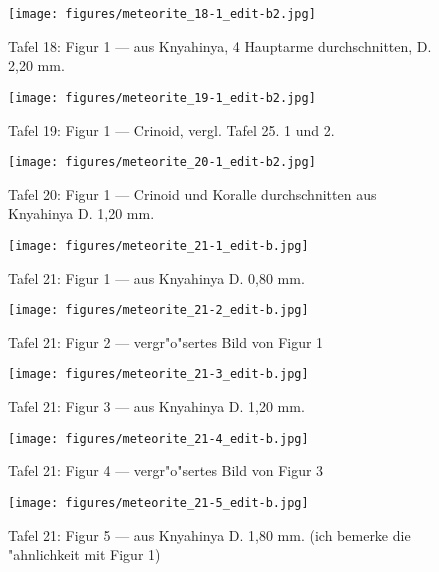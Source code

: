 \documentclass[a4paper, 11pt, oneside]{article}
\begin{document}
\begin{figure}[t]
\texttt{[image: figures/meteorite\_18-1\_edit-b2.jpg]}
\caption{Tafel 18: Figur 1 --- aus Knyahinya, 4 Hauptarme durchschnitten, D. 2,20 mm.}
\centering
\end{figure}
\clearpage
{}
\begin{figure}[t]
\texttt{[image: figures/meteorite\_19-1\_edit-b2.jpg]}
\caption{Tafel 19: Figur 1 --- Crinoid, vergl. Tafel 25. 1 und 2.}
\centering
\end{figure}
\clearpage
{}
\begin{figure}[t]
\texttt{[image: figures/meteorite\_20-1\_edit-b2.jpg]}
\caption{Tafel 20: Figur 1 --- Crinoid und Koralle durchschnitten aus Knyahinya D. 1,20 mm.}
\centering
\end{figure}
\clearpage
{}
\begin{figure}[t]
\texttt{[image: figures/meteorite\_21-1\_edit-b.jpg]}
\caption{Tafel 21: Figur 1 --- aus Knyahinya D. 0,80 mm.}
\centering
\end{figure}
\clearpage
\begin{figure}[t]
\texttt{[image: figures/meteorite\_21-2\_edit-b.jpg]}
\caption{Tafel 21: Figur 2 --- vergr"o"sertes Bild von Figur 1}
\centering
\end{figure}
\clearpage
\begin{figure}[t]
\texttt{[image: figures/meteorite\_21-3\_edit-b.jpg]}
\caption{Tafel 21: Figur 3 --- aus Knyahinya D. 1,20 mm.}
\centering
\end{figure}
\clearpage
\begin{figure}[t]
\texttt{[image: figures/meteorite\_21-4\_edit-b.jpg]}
\caption{Tafel 21: Figur 4 --- vergr"o"sertes Bild von Figur 3}
\centering
\end{figure}
\clearpage
\begin{figure}[t]
\texttt{[image: figures/meteorite\_21-5\_edit-b.jpg]}
\caption{Tafel 21: Figur 5 --- aus Knyahinya D. 1,80 mm. (ich bemerke die "ahnlichkeit mit Figur 1)}
\centering
\end{figure}
\end{document}
